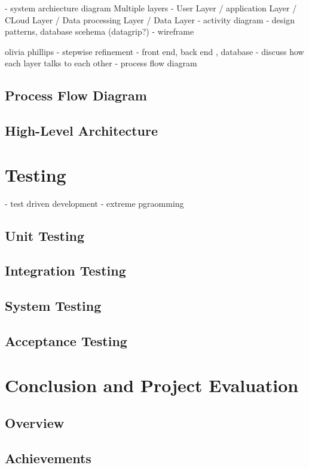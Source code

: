 \documentclass{report}
\begin{document}
- system archiecture diagram Multiple layers - User Layer / application Layer / CLoud Layer / Data processing Layer / Data Layer 
- activity diagram 
- design patterns, database scehema (datagrip?)
- wireframe

olivia phillips 
- stepwise refinement 
- front end, back end , database  - discuss how each layer talks to each other 
- process flow diagram 


\section{Process Flow Diagram}
\section{High-Level Architecture}

\chapter{Testing}

- test driven development 
- extreme pgraomming 

\section{Unit Testing}
\section{Integration Testing}
\section{System Testing}
\section{Acceptance Testing}

\chapter{Conclusion and Project Evaluation}

\section{Overview}

\section{Achievements}
\end{document}
